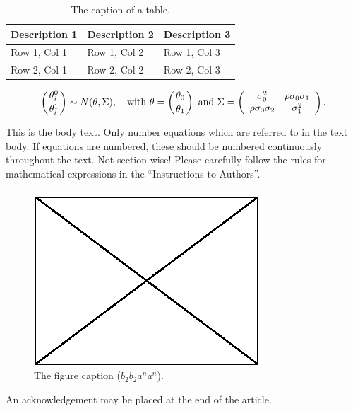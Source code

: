 \documentclass[bimj,fleqn]{w-art}
\theoremstyle{plain}
\theoremstyle{definition}
\begin{document}
\begin{table}[htb]
\begin{center}
\caption{The caption of a table.}
\begin{tabular}{lll}
\hline
Description 1 & Description 2 & Description 3\\
\hline
Row 1, Col 1 & Row 1, Col 2 & Row 1, Col 3\\
Row 2, Col 1 & Row 2, Col 2 & Row 2, Col 3\\
\hline
\end{tabular}
\end{center}
\end{table}
\begin{equation}
\left({\theta^{0}_{i}}\atop{\theta^{1}_{i}}\right) \sim N(\theta,\Sigma),\quad {\mathrm{with}}\ 
{{\theta}} = \left({\theta_{0}}\atop{\theta_{1}}\right)\ {\mathrm{and}}\ \Sigma =
\left(\begin{array}{cc}
\sigma^{2}_{0} & \rho\sigma_{0}\sigma_{1}\\
\rho\sigma_{0}\sigma_{2} & \sigma^{2}_{1}
\end{array}\right).
\end{equation}

\noindent This is the body text. Only number equations which are referred to in the text body. If equations
are numbered, these should be numbered continuously throughout the text. Not section wise! Please
carefully follow the rules for mathematical expressions in the ``Instructions to Authors''.

\begin{figure}[htb]
\begin{center}
\includegraphics[bb= 0 0 115 87]{empty.eps}
\caption{The figure caption ($b_{2}b_{2}a^{n}a^{n}$).}
\end{center}
\end{figure}
\begin{acknowledgement}
An acknowledgement may be placed at the end of the article.
\end{acknowledgement}
\vspace*{1pc}
\end{document}
